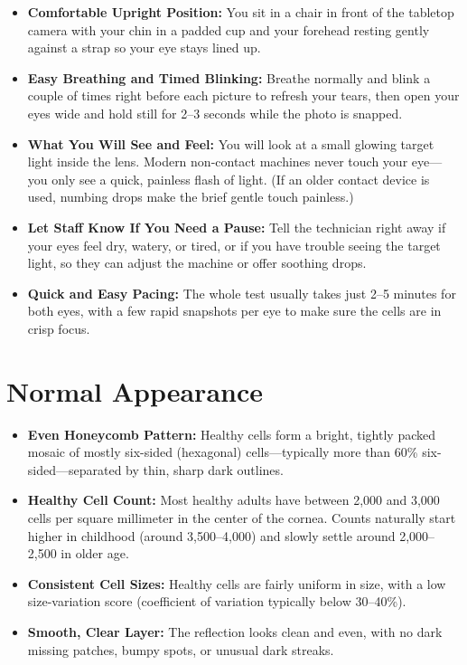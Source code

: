 \begin{itemize}
    \item \textbf{Comfortable Upright Position:} You sit in a chair in front of the tabletop camera with your chin in a padded cup and your forehead resting gently against a strap so your eye stays lined up.
    \item \textbf{Easy Breathing and Timed Blinking:} Breathe normally and blink a couple of times right before each picture to refresh your tears, then open your eyes wide and hold still for 2--3 seconds while the photo is snapped.
    \item \textbf{What You Will See and Feel:} You will look at a small glowing target light inside the lens. Modern non-contact machines never touch your eye---you only see a quick, painless flash of light. (If an older contact device is used, numbing drops make the brief gentle touch painless.)
    \item \textbf{Let Staff Know If You Need a Pause:} Tell the technician right away if your eyes feel dry, watery, or tired, or if you have trouble seeing the target light, so they can adjust the machine or offer soothing drops.
    \item \textbf{Quick and Easy Pacing:} The whole test usually takes just 2--5 minutes for both eyes, with a few rapid snapshots per eye to make sure the cells are in crisp focus.
\end{itemize}

\section{Normal Appearance}

\begin{itemize}
    \item \textbf{Even Honeycomb Pattern:} Healthy cells form a bright, tightly packed mosaic of mostly six-sided (hexagonal) cells---typically more than 60\% six-sided---separated by thin, sharp dark outlines.
    \item \textbf{Healthy Cell Count:} Most healthy adults have between 2,000 and 3,000 cells per square millimeter in the center of the cornea. Counts naturally start higher in childhood (around 3,500--4,000) and slowly settle around 2,000--2,500 in older age.
    \item \textbf{Consistent Cell Sizes:} Healthy cells are fairly uniform in size, with a low size-variation score (coefficient of variation typically below 30--40\%).
    \item \textbf{Smooth, Clear Layer:} The reflection looks clean and even, with no dark missing patches, bumpy spots, or unusual dark streaks.
\end{itemize}

